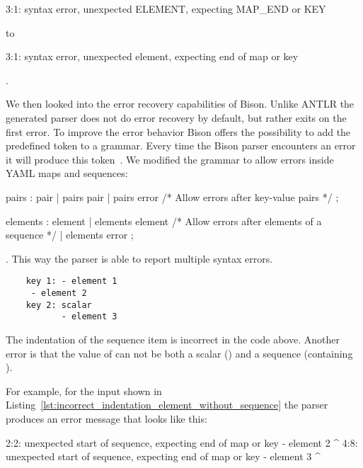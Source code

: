 \begin{textcode}
  3:1: syntax error, unexpected ELEMENT, expecting MAP_END or KEY
\end{textcode}

to

\begin{textcode}
  3:1: syntax error, unexpected element, expecting end of map or key
\end{textcode}

.

We then looked into the error recovery capabilities of Bison. Unlike ANTLR the generated parser does not do error recovery by default, but rather exits on the first error. To improve the error behavior Bison offers the possibility to add the predefined  token to a grammar. Every time the Bison parser encounters an error it will produce this token~\cite{donnelly2019bison}. We modified the grammar to allow errors inside YAML maps and sequences:

\begin{ccode}
  pairs : pair
        | pairs pair
        | pairs error /* Allow errors after key-value pairs */
        ;

  elements : element
           | elements element
           /* Allow errors after elements of a sequence */
           | elements error
           ;
\end{ccode}

. This way the parser is able to report multiple syntax errors.

\begin{listing}
  \begin{verbatim}
    key 1: - element 1
     - element 2
    key 2: scalar
           - element 3
  \end{verbatim}
  \caption{The indentation of the sequence item  is incorrect in the code above. Another error is that the value of  can not be both a scalar () and a sequence (containing ).}
  \label{lst:incorrect_indentation_element_without_sequence}
\end{listing}

For example, for the input shown in Listing~\ref{lst:incorrect_indentation_element_without_sequence} the parser produces an error message that looks like this:

\begin{textcode}
2:2: unexpected start of sequence, expecting end of map or key
      - element 2
      ^
4:8: unexpected start of sequence, expecting end of map or key
            - element 3
            ^
\end{textcode}

